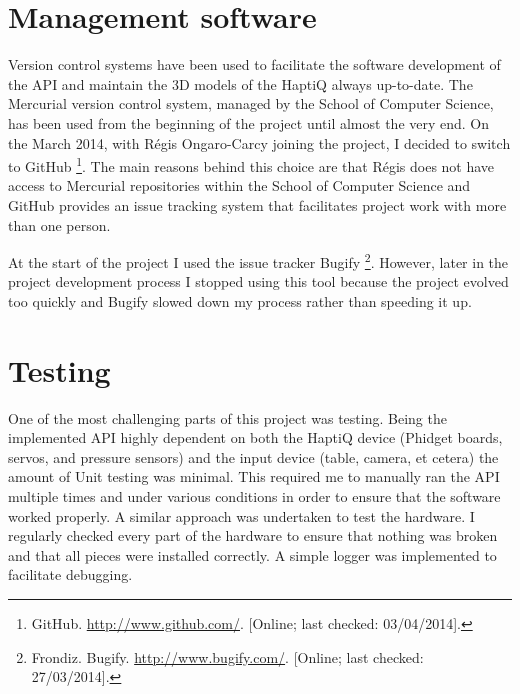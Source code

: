 \section{Management software}
Version control systems have been used to facilitate the software development of the API and maintain the 3D models of the HaptiQ always up-to-date. The Mercurial version control system, managed by the School of Computer Science, has been used from the beginning of the project until almost the very end. On the  March 2014, with Régis Ongaro-Carcy joining the project, I decided to switch to GitHub \footnote{GitHub. \url{http://www.github.com/}. [Online; last checked: 03/04/2014].}. The main reasons behind this choice are that Régis does not have access to Mercurial repositories within the School of Computer Science and GitHub provides an issue tracking system that facilitates project work with more than one person.  

At the start of the project I used the issue tracker Bugify \footnote{Frondiz. Bugify. \url{http://www.bugify.com/}. [Online; last checked: 27/03/2014].}. However, later in the project development process I stopped using this tool because the project evolved too quickly and Bugify slowed down my process rather than speeding it up. 

\section{Testing}
One of the most challenging parts of this project was testing. Being the implemented API highly dependent on both the HaptiQ device (Phidget boards, servos, and pressure sensors) and the input device (table, camera, et cetera) the amount of Unit testing was minimal. This required me to manually ran the API multiple times and under various conditions in order to ensure that the software worked properly. A similar approach was undertaken to test the hardware. I regularly checked every part of the hardware to ensure that nothing was broken and that all pieces were installed correctly.
A simple logger was implemented to facilitate debugging.